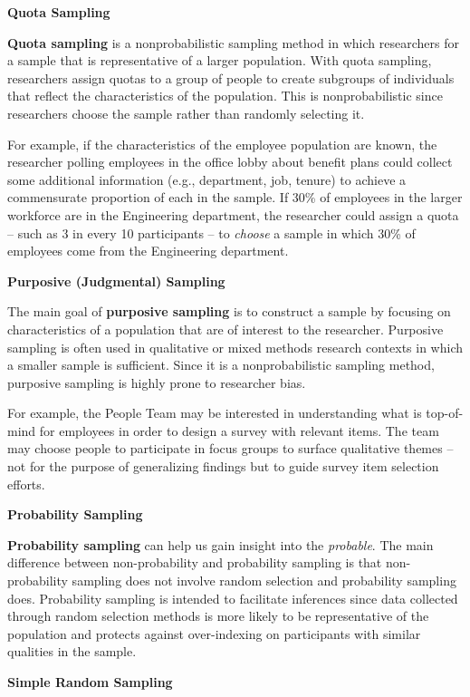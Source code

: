\documentclass[]{book}
\begin{document}
\textbf{Quota Sampling}

\textbf{Quota sampling} is a nonprobabilistic sampling method in which researchers for a sample that is representative of a larger population. With quota sampling, researchers assign quotas to a group of people to create subgroups of individuals that reflect the characteristics of the population. This is nonprobabilistic since researchers choose the sample rather than randomly selecting it.

For example, if the characteristics of the employee population are known, the researcher polling employees in the office lobby about benefit plans could collect some additional information (e.g., department, job, tenure) to achieve a commensurate proportion of each in the sample. If 30\% of employees in the larger workforce are in the Engineering department, the researcher could assign a quota -- such as 3 in every 10 participants -- to \emph{choose} a sample in which 30\% of employees come from the Engineering department.

\textbf{Purposive (Judgmental) Sampling}

The main goal of \textbf{purposive sampling} is to construct a sample by focusing on characteristics of a population that are of interest to the researcher. Purposive sampling is often used in qualitative or mixed methods research contexts in which a smaller sample is sufficient. Since it is a nonprobabilistic sampling method, purposive sampling is highly prone to researcher bias.

For example, the People Team may be interested in understanding what is top-of-mind for employees in order to design a survey with relevant items. The team may choose people to participate in focus groups to surface qualitative themes -- not for the purpose of generalizing findings but to guide survey item selection efforts.

\textbf{Probability Sampling}

\textbf{Probability sampling} can help us gain insight into the \emph{probable}. The main difference between non-probability and probability sampling is that non-probability sampling does not involve random selection and probability sampling does. Probability sampling is intended to facilitate inferences since data collected through random selection methods is more likely to be representative of the population and protects against over-indexing on participants with similar qualities in the sample.

\textbf{Simple Random Sampling}
\end{document}
